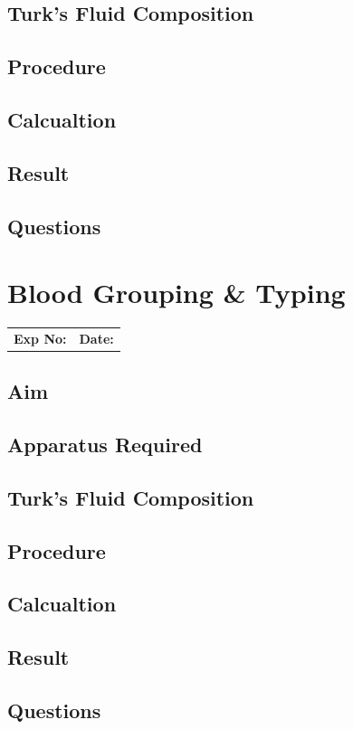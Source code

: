\documentclass[a4paper,12pt]{book}
\begin{document}
	\section*{Turk's Fluid Composition}
	\section*{Procedure}
	\section*{Calcualtion}
	\section*{Result}
	\section*{Questions}

\chapter*{\centering Blood Grouping \& Typing}
		\begin{tabular}{p{5in} p{1in}}
			\textbf{Exp No:}  & \textbf{Date:}\\
		\end{tabular}

	\section*{Aim}
	\section*{Apparatus Required}
	\section*{Turk's Fluid Composition}
	\section*{Procedure}
	\section*{Calcualtion}
	\section*{Result}
	\section*{Questions}
\end{document}
